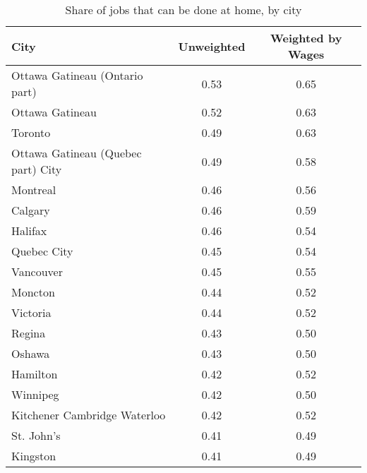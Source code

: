 \begin{table}[ht]
\centering
\caption{Share of jobs that can be done at home, by city} 
\label{tab:provinces}
\begingroup\scriptsize
\begin{tabular}{lcc}
  \hline
City & Unweighted & Weighted by Wages \\ 
  \hline
Ottawa   Gatineau (Ontario part) & 0.53 & 0.65 \\ 
  Ottawa   Gatineau & 0.52 & 0.63 \\ 
  Toronto & 0.49 & 0.63 \\ 
  Ottawa   Gatineau (Quebec part) City & 0.49 & 0.58 \\ 
  Montreal & 0.46 & 0.56 \\ 
  Calgary & 0.46 & 0.59 \\ 
  Halifax & 0.46 & 0.54 \\ 
  Quebec City & 0.45 & 0.54 \\ 
  Vancouver & 0.45 & 0.55 \\ 
  Moncton & 0.44 & 0.52 \\ 
  Victoria & 0.44 & 0.52 \\ 
  Regina & 0.43 & 0.50 \\ 
  Oshawa & 0.43 & 0.50 \\ 
  Hamilton & 0.42 & 0.52 \\ 
  Winnipeg & 0.42 & 0.50 \\ 
  Kitchener   Cambridge   Waterloo & 0.42 & 0.52 \\ 
  St. John's & 0.41 & 0.49 \\ 
  Kingston & 0.41 & 0.49 \\ 
   \hline
\end{tabular}
\endgroup
\end{table}
